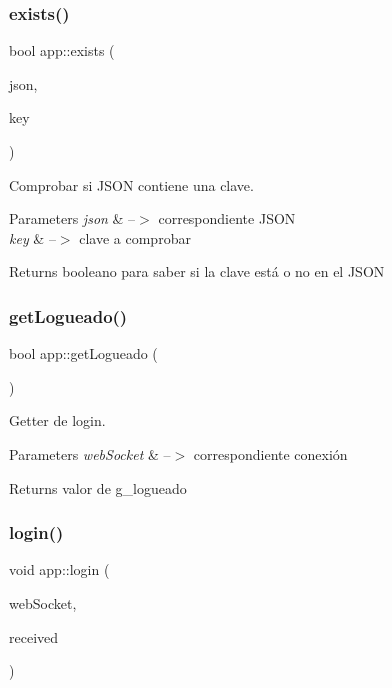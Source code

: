 \subsubsection{\texorpdfstring{exists()}{exists()}}
{\footnotesize\ttfamily bool app\+::exists (\begin{DoxyParamCaption}\item[{const J\+S\+ON \&}]{json,  }\item[{const std\+::string \&}]{key }\end{DoxyParamCaption})}



Comprobar si J\+S\+ON contiene una clave. 


\begin{DoxyParams}{Parameters}
{\em json} & --$>$ correspondiente J\+S\+ON \\
\hline
{\em key} & --$>$ clave a comprobar \\
\hline
\end{DoxyParams}
\begin{DoxyReturn}{Returns}
booleano para saber si la clave está o no en el J\+S\+ON 
\end{DoxyReturn}
\mbox{\label{classapp_a9d5d32bf19b4ae0a9c9d7fab8d87ac0f}} 
\subsubsection{\texorpdfstring{get\+Logueado()}{getLogueado()}}
{\footnotesize\ttfamily bool app\+::get\+Logueado (\begin{DoxyParamCaption}{ }\end{DoxyParamCaption})}



Getter de login. 


\begin{DoxyParams}{Parameters}
{\em web\+Socket} & --$>$ correspondiente conexión \\
\hline
\end{DoxyParams}
\begin{DoxyReturn}{Returns}
valor de g\+\_\+logueado 
\end{DoxyReturn}
\mbox{\label{classapp_a0bb96ab42618921392ac30e13444391c}} 
\subsubsection{\texorpdfstring{login()}{login()}}
{\footnotesize\ttfamily void app\+::login (\begin{DoxyParamCaption}\item[{ix\+::\+Web\+Socket $\ast$}]{web\+Socket,  }\item[{J\+S\+ON}]{received }\end{DoxyParamCaption})}



